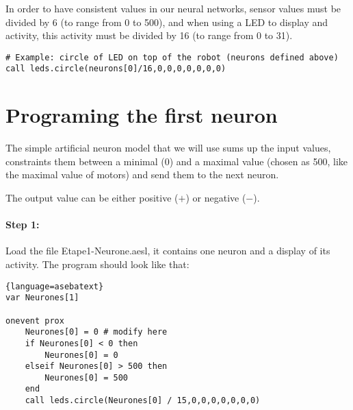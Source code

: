 \documentclass[12pt]{article}
\newcommand{\firstfile}{Etape1-Neurone.aesl}
\begin{document}
In order to have consistent values in our neural networks, sensor values must be divided by 6 (to range from 0 to 500), and when using a LED to display and activity, this activity must be divided by 16 (to range from 0 to 31).

\begin{lstlisting}
# Example: circle of LED on top of the robot (neurons defined above)
call leds.circle(neurons[0]/16,0,0,0,0,0,0,0)
\end{lstlisting}

\section{Programing the first neuron}

The simple artificial neuron model that we will use sums up the input values, constraints them between a minimal (0) and a maximal value (chosen as 500, like the maximal value of motors) and send them to the next neuron.

\begin{center}
\end{center}

The output value can be either positive ($+$) or negative ($-$).

\paragraph{Step 1:} Load the file \firstfile, it contains one neuron and a display of its activity. The program should look like that:

\begin{lstlisting}{language=asebatext}
var Neurones[1]

onevent prox
    Neurones[0] = 0 # modify here 
    if Neurones[0] < 0 then
        Neurones[0] = 0
    elseif Neurones[0] > 500 then
        Neurones[0] = 500
    end
    call leds.circle(Neurones[0] / 15,0,0,0,0,0,0,0)
\end{lstlisting}
\end{document}
